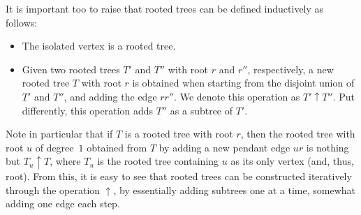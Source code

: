 \documentclass[a4paper,11pt,dvipsnames]{elsarticle}
\begin{document}
It is important too to raise that rooted trees can be defined inductively as follows:
\begin{itemize}
    \item The isolated vertex is a rooted tree.
    
    \item Given two rooted trees $T'$ and $T''$ with root $r$ and $r''$, respectively, a new rooted tree $T$ with root $r$ is obtained when starting from the disjoint union of $T'$ and $T''$, and adding the edge $rr''$. We denote this operation as $T'\uparrow T''$.
    Put differently, this operation adds $T''$ as a subtree of $T'$.
\end{itemize}

\noindent Note in particular that if $T$ is a rooted tree with root $r$, then the rooted tree with root $u$ of degree~$1$ obtained from $T$ by adding a new pendant edge $ur$ is nothing but $T_u \uparrow T$, where $T_u$ is the rooted tree containing $u$ as its only vertex (and, thus, root). From this, it is easy to see that rooted trees can be constructed iteratively through the operation $\uparrow$, by essentially adding subtrees one at a time, somewhat adding one edge each step.
\end{document}
